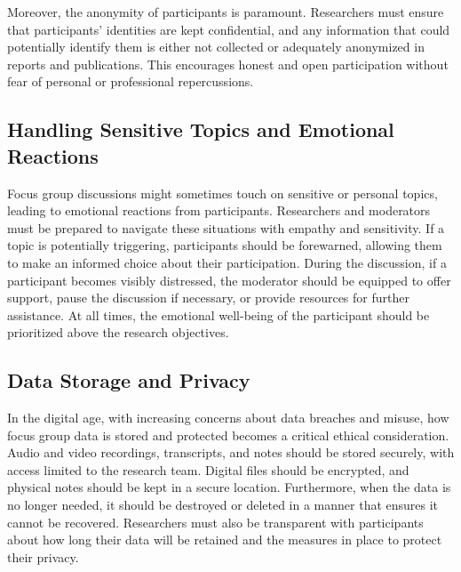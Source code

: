 \documentclass[
  b5paper]{book}
\begin{document}
Moreover, the anonymity of participants is paramount. Researchers must ensure that participants' identities are kept confidential, and any information that could potentially identify them is either not collected or adequately anonymized in reports and publications. This encourages honest and open participation without fear of personal or professional repercussions.

\hypertarget{handling-sensitive-topics-and-emotional-reactions}{%
\subsection*{Handling Sensitive Topics and Emotional Reactions}\label{handling-sensitive-topics-and-emotional-reactions}}

Focus group discussions might sometimes touch on sensitive or personal topics, leading to emotional reactions from participants. Researchers and moderators must be prepared to navigate these situations with empathy and sensitivity. If a topic is potentially triggering, participants should be forewarned, allowing them to make an informed choice about their participation. During the discussion, if a participant becomes visibly distressed, the moderator should be equipped to offer support, pause the discussion if necessary, or provide resources for further assistance. At all times, the emotional well-being of the participant should be prioritized above the research objectives.

\hypertarget{data-storage-and-privacy}{%
\subsection*{Data Storage and Privacy}\label{data-storage-and-privacy}}

In the digital age, with increasing concerns about data breaches and misuse, how focus group data is stored and protected becomes a critical ethical consideration. Audio and video recordings, transcripts, and notes should be stored securely, with access limited to the research team. Digital files should be encrypted, and physical notes should be kept in a secure location. Furthermore, when the data is no longer needed, it should be destroyed or deleted in a manner that ensures it cannot be recovered. Researchers must also be transparent with participants about how long their data will be retained and the measures in place to protect their privacy.
\end{document}
